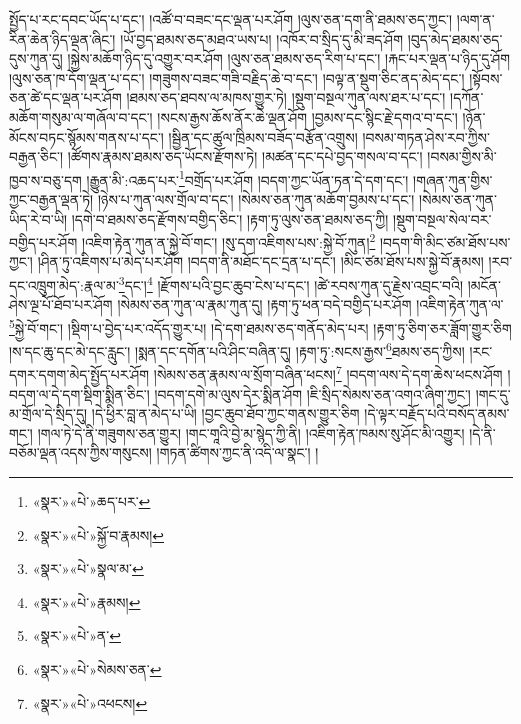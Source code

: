 \documentclass[12pt,a4paper]{book}
\begin{document}
སྤྱོད་པ་རང་དབང་ཡོད་པ་དང་། །འཚོ་བ་བཟང་དང་ལྡན་པར་ཤོག །ལུས་ཅན་དག་ནི་ཐམས་ཅད་ཀྱང་། །ལག་ན་རིན་ཆེན་ཉིད་ལྡན་ཞིང་། །ཡོ་བྱད་ཐམས་ཅད་མཐའ་ཡས་པ། །འཁོར་བ་སྲིད་དུ་མི་ཟད་ཤོག །བུད་མེད་ཐམས་ཅད་དུས་ཀུན་དུ། །སྐྱེས་མཆོག་ཉིད་དུ་འགྱུར་བར་ཤོག །ལུས་ཅན་ཐམས་ཅད་རིག་པ་དང་། །རྐང་པར་ལྡན་པ་ཉིད་དུ་ཤོག །ལུས་ཅན་ཁ་དོག་ལྡན་པ་དང་། །གཟུགས་བཟང་གཟི་བརྗིད་ཆེ་བ་དང་། །བལྟ་ན་སྡུག་ཅིང་ནད་མེད་དང་། །སྟོབས་ཅན་ཚེ་དང་ལྡན་པར་ཤོག །ཐམས་ཅད་ཐབས་ལ་མཁས་གྱུར་ཏེ། །སྡུག་བསྔལ་ཀུན་ལས་ཐར་པ་དང་། །དཀོན་མཆོག་གསུམ་ལ་གཞོལ་བ་དང་། །སངས་རྒྱས་ཆོས་ནོར་ཆེ་ལྡན་ཤོག །བྱམས་དང་སྙིང་རྗེ་དགའ་བ་དང་། །ཉོན་མོངས་བཏང་སྙོམས་གནས་པ་དང་། །སྦྱིན་དང་ཚུལ་ཁྲིམས་བཟོད་བརྩོན་འགྲུས། །བསམ་གཏན་ཤེས་རབ་ཀྱིས་བརྒྱན་ཅིང་། །ཚོགས་རྣམས་ཐམས་ཅད་ཡོངས་རྫོགས་ཏེ། །མཚན་དང་དཔེ་བྱད་གསལ་བ་དང་། །བསམ་གྱིས་མི་ཁྱབ་ས་བཅུ་དག །རྒྱུན་མི་:འཆད་པར་\footnote{«སྣར་»«པེ་»ཆད་པར་}བགྲོད་པར་ཤོག །བདག་ཀྱང་ཡོན་ཏན་དེ་དག་དང་། །གཞན་ཀུན་གྱིས་ཀྱང་བརྒྱན་ལྡན་ཏེ། །ཉེས་པ་ཀུན་ལས་གྲོལ་བ་དང་། །སེམས་ཅན་ཀུན་མཆོག་བྱམས་པ་དང་། །སེམས་ཅན་ཀུན་ཡིད་རེ་བ་ཡི། །དགེ་བ་ཐམས་ཅད་རྫོགས་བགྱིད་ཅིང་། །རྟག་ཏུ་ལུས་ཅན་ཐམས་ཅད་ཀྱི། །སྡུག་བསྔལ་སེལ་བར་བགྱིད་པར་ཤོག །འཇིག་རྟེན་ཀུན་ན་སྐྱེ་བོ་གང་། །སུ་དག་འཇིགས་པས་:སྐྱེ་བོ་ཀུན།\footnote{«སྣར་»«པེ་»སྐྱོ་བ་རྣམས།} །བདག་གི་མིང་ཙམ་ཐོས་པས་ཀྱང་། །ཤིན་ཏུ་འཇིགས་པ་མེད་པར་ཤོག །བདག་ནི་མཐོང་དང་དྲན་པ་དང་། །མིང་ཙམ་ཐོས་པས་སྐྱེ་བོ་རྣམས། །རབ་དང་འཁྲུག་མེད་:རྣལ་མ་\footnote{«སྣར་»«པེ་»སྣལ་མ་}དང་།\footnote{«སྣར་»«པེ་»རྣམས།} །རྫོགས་པའི་བྱང་ཆུབ་ངེས་པ་དང་། །ཚེ་རབས་ཀུན་དུ་རྗེས་འབྲང་བའི། །མངོན་ཤེས་ལྔ་པོ་ཐོབ་པར་ཤོག །སེམས་ཅན་ཀུན་ལ་རྣམ་ཀུན་དུ། །རྟག་ཏུ་ཕན་བདེ་བགྱིད་པར་ཤོག །འཇིག་རྟེན་ཀུན་ལ་\footnote{«སྣར་»«པེ་»ན་}སྐྱེ་བོ་གང་། །སྡིག་པ་བྱེད་པར་འདོད་གྱུར་པ། །དེ་དག་ཐམས་ཅད་གནོད་མེད་པར། །རྟག་ཏུ་ཅིག་ཅར་ཟློག་གྱུར་ཅིག །ས་དང་ཆུ་དང་མེ་དང་རླུང་། །སྨན་དང་དགོན་པའི་ཤིང་བཞིན་དུ། །རྟག་ཏུ་:སངས་རྒྱས་\footnote{«སྣར་»«པེ་»སེམས་ཅན་}ཐམས་ཅད་ཀྱིས། །རང་དགར་དགག་མེད་སྤྱོད་པར་ཤོག །སེམས་ཅན་རྣམས་ལ་སྲོག་བཞིན་ཕངས།\footnote{«སྣར་»«པེ་»འཕངས།} །བདག་ལས་དེ་དག་ཆེས་ཕངས་ཤོག །བདག་ལ་དེ་དག་སྡིག་སྨིན་ཅིང་། །བདག་དགེ་མ་ལུས་དེར་སྨིན་ཤོག །ཇི་སྲིད་སེམས་ཅན་འགའ་ཞིག་ཀྱང་། །གང་དུ་མ་གྲོལ་དེ་སྲིད་དུ། །དེ་ཕྱིར་བླ་ན་མེད་པ་ཡི། །བྱང་ཆུབ་ཐོབ་ཀྱང་གནས་གྱུར་ཅིག །དེ་ལྟར་བརྗོད་པའི་བསོད་ནམས་གང་། །གལ་ཏེ་དེ་ནི་གཟུགས་ཅན་གྱུར། །གང་གཱའི་བྱེ་མ་སྙེད་ཀྱི་ནི། །འཇིག་རྟེན་ཁམས་སུ་ཤོང་མི་འགྱུར། །དེ་ནི་བཅོམ་ལྡན་འདས་ཀྱིས་གསུངས། །གཏན་ཚིགས་ཀྱང་ནི་འདི་ལ་སྣང་། །
\end{document}
